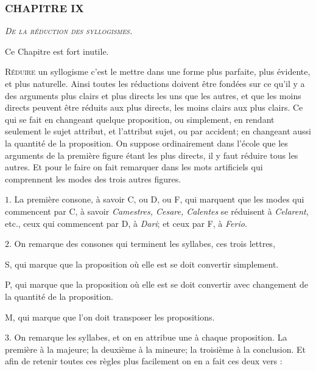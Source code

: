 \subsubsection{\centering \Large CHAPITRE IX}
\begin{center}\emph{\large\scshape De la réduction des syllogismes.}\end{center}

\begin{center}{\footnotesize Ce Chapitre est fort inutile.}\end{center}

	\lettrine{R}{éduire} un syllogisme c'est le mettre dans une forme plus parfaite, plus évidente, et plus naturelle. Ainsi toutes les réductions doivent être fondées sur ce qu'il y a des arguments plus clairs et plus directs les uns que les autres, et que les moins directs peuvent être réduits aux plus directs, les moins clairs aux plus clairs. Ce qui se fait en changeant quelque proposition, ou simplement, en rendant seulement le sujet attribut, et l'attribut sujet, ou par accident; en changeant aussi la quantité de la proposition. On suppose ordinairement dans l'école que les arguments de la première figure étant les plus directs, il y faut réduire tous les autres. Et pour le faire on fait remarquer dans les mots artificiels qui comprennent les modes des trois autres figures.

\bigbreak
$1$. La première consone, à savoir C, ou D, ou F, qui marquent que les modes qui commencent par C, à savoir \emph{Camestres, Cesare, Calentes} se réduisent à \emph{Celarent}, etc., ceux qui commencent par D, à \emph{Dari}; et ceux par F, à \emph{Ferio}.

\bigbreak
$2$. On remarque des consones qui terminent les syllabes, ces trois lettres,

S, qui marque que la proposition où elle est se doit convertir simplement.

P, qui marque que la proposition où elle est se doit convertir avec changement de la quantité de la proposition.

M, qui marque que l'on doit transposer les propositions.

\bigbreak
$3$. On remarque les syllabes, et on en attribue une à chaque proposition. La première à la majeure; la deuxième à la mineure; la troisième à la conclusion. Et afin de retenir toutes ces règles plus facilement on en a fait ces deux vers :

